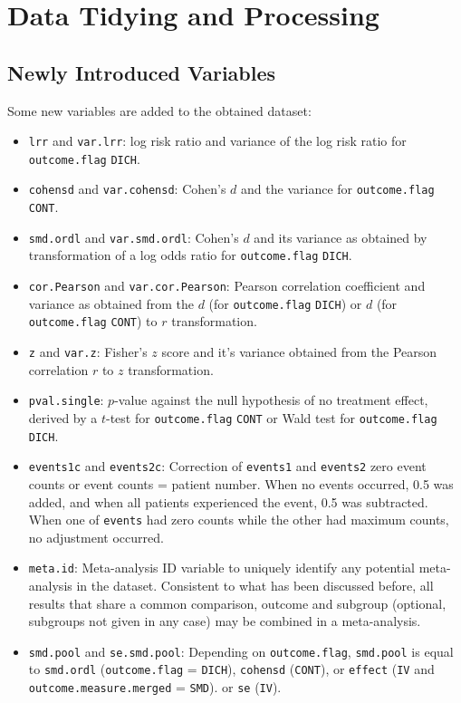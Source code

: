 \documentclass[11pt,a4paper,twoside]{book}\usepackage[]{graphicx}\usepackage[]{color}
\begin{document}
\section{Data Tidying and Processing} \label{sec:Processing}

\subsection{Newly Introduced Variables}
Some new variables are added to the obtained dataset:
\begin{itemize}
\item \texttt{lrr} and \texttt{var.lrr}: log risk ratio and variance of the log risk ratio for \texttt{outcome.flag} \texttt{DICH}.
\item \texttt{cohensd} and \texttt{var.cohensd}: Cohen's $d$ and the variance for \texttt{outcome.flag} \texttt{CONT}. 
\item \texttt{smd.ordl} and \texttt{var.smd.ordl}: Cohen's $d$ and its variance as obtained by transformation of a log odds ratio for \texttt{outcome.flag} \texttt{DICH}.
\item \texttt{cor.Pearson} and \texttt{var.cor.Pearson}: Pearson correlation coefficient and variance as obtained from the $d$ (for \texttt{outcome.flag} \texttt{DICH}) or $d$ (for \texttt{outcome.flag} \texttt{CONT}) to $r$ transformation.
\item \texttt{z} and \texttt{var.z}: Fisher's $z$ score and it's variance obtained from the Pearson correlation $r$ to $z$ transformation.
\item \texttt{pval.single}: $p$-value against the null hypothesis of no treatment effect, derived by a $t$-test for \texttt{outcome.flag} \texttt{CONT} or Wald test for \texttt{outcome.flag} \texttt{DICH}.
\item \texttt{events1c} and \texttt{events2c}: Correction of \texttt{events1} and \texttt{events2} zero event counts or event counts = patient number. When no events occurred, 0.5 was added, and when all patients experienced the event, 0.5 was subtracted. When one of \texttt{events} had zero counts while the other had maximum counts, no adjustment occurred.
\item \texttt{meta.id}: Meta-analysis ID variable to uniquely identify any potential meta-analysis in the dataset. Consistent to what has been discussed before, all results that share a common comparison, outcome and subgroup (optional, subgroups not given in any case) may be combined in a meta-analysis.
\item \texttt{smd.pool} and \texttt{se.smd.pool}: Depending on \texttt{outcome.flag}, \texttt{smd.pool} is equal to \texttt{smd.ordl} (\texttt{outcome.flag} = \texttt{DICH}), \texttt{cohensd} (\texttt{CONT}), or \texttt{effect} (\texttt{IV} and \texttt{outcome.measure.merged} = \texttt{SMD}).
or \texttt{se} (\texttt{IV}).
\end{itemize}
\end{document}
